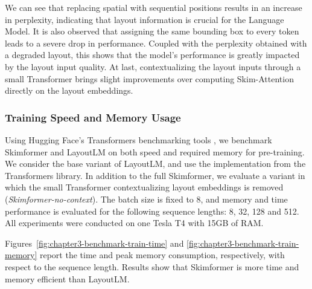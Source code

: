 We can see that replacing spatial with sequential positions results in an increase in perplexity, indicating that layout information is crucial for the Language Model. It is also observed that assigning the same bounding box to every token leads to a severe drop in performance. Coupled with the perplexity obtained with a degraded layout, this shows that the model's performance is greatly impacted by the layout input quality. At last, contextualizing the layout inputs through a small Transformer brings slight improvements over computing Skim-Attention directly on the layout embeddings.

\subsubsection{Training Speed and Memory Usage}

Using Hugging Face's Transformers benchmarking tools \citep{wolf2019huggingface}, we benchmark Skimformer and LayoutLM on both speed and required memory for pre-training. We consider the base variant of LayoutLM, and use the implementation from the Transformers library. In addition to the full Skimformer, we evaluate a variant in which the small Transformer contextualizing layout embeddings is removed (\textit{Skimformer-no-context}). The batch size is fixed to 8, and memory and time performance is evaluated for the following sequence lengths: 8, 32, 128 and 512. All experiments were conducted on one Tesla T4 with 15GB of RAM.


Figures~\ref{fig:chapter3-benchmark-train-time} and \ref{fig:chapter3-benchmark-train-memory} report the time and peak memory consumption, respectively, with respect to the sequence length. Results show that Skimformer is more time and memory efficient than LayoutLM. 

